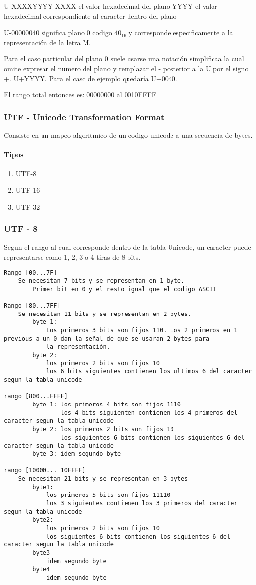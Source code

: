 U-XXXXYYYY
XXXX el valor hexadecimal del plano
YYYY el valor hexadecimal correspondiente al caracter dentro del plano

U-00000040 significa plano 0 codigo $40_{16}$ y corresponde especificamente a la representación de la letra M.

Para el caso particular del plano 0 suele usarse una notación simplificaa la cual omite expresar el numero del plano y remplazar el - posterior a la U por el signo +. U+YYYY. Para el caso de ejemplo quedaría U+0040. 

El rango total entonces es: 00000000 al 0010FFFF

\subsubsection{UTF - Unicode Transformation Format}
Consiste en un mapeo algoritmico de un codigo unicode a una secuencia de bytes.

\paragraph{Tipos}
\begin{enumerate}    
  \item UTF-8
  \item UTF-16
  \item UTF-32
\end{enumerate}

\subsubsection{UTF - 8}

Segun el rango al cual corresponde dentro de la tabla Unicode, un caracter puede representarse como 1, 2, 3 o 4 tiras de 8 bits.

\begin{verbatim}
Rango [00...7F]
	Se necesitan 7 bits y se representan en 1 byte.
		Primer bit en 0 y el resto igual que el codigo ASCII

Rango [80...7FF]
	Se necesitan 11 bits y se representan en 2 bytes.
		byte 1:
			Los primeros 3 bits son fijos 110. Los 2 primeros en 1 previous a un 0 dan la señal de que se usaran 2 bytes para
			la representación.
		byte 2:
			los primeros 2 bits son fijos 10
			los 6 bits siguientes contienen los ultimos 6 del caracter segun la tabla unicode

rango [800...FFFF]
		byte 1: los primeros 4 bits son fijos 1110
				los 4 bits siguienten contienen los 4 primeros del caracter segun la tabla unicode
		byte 2:	los primeros 2 bits son fijos 10
				los siguientes 6 bits contienen los siguientes 6 del caracter segun la tabla unicode
		byte 3:	idem segundo byte

rango [10000... 10FFFF]
	Se necesitan 21 bits y se representan en 3 bytes
		byte1:
			los primeros 5 bits son fijos 11110
			los 3 siguientes contienen los 3 primeros del caracter segun la tabla unicode
		byte2:
			los primeros 2 bits son fijos 10
			los siguientes 6 bits contienen los siguientes 6 del caracter segun la tabla unicode
		byte3
			idem segundo byte
		byte4
			idem segundo byte
\end{verbatim}

